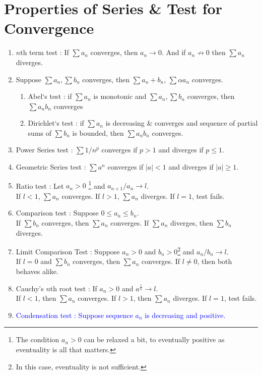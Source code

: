 \section{Properties of Series \& Test for Convergence}
\begin{enumerate}
	\item $n$th term test : If $\sum a_n$ converges, then $a_n \to 0$. And if $a_n \not\to 0$ then $\sum a_n$ diverges.
	\item Suppose $\sum a_n, \sum b_n$ converges, then $\sum a_n+b_n$, $\sum \alpha a_n$ converges.
		\begin{enumerate}
			\item Abel`s test : if $\sum a_n$ is monotonic and $\sum a_n,\sum b_n$ converges, then $\sum a_nb_n$ converges
			\item Dirichlet`s test : if $\sum a_n$ is decreasing \& converges and sequence of partial sums of $\sum b_n$ is bounded, then $\sum a_nb_n$ converges.
		\end{enumerate}
	\item Power Series test : $\sum 1/n^p$ converges if $p>1$ and diverges if $p \le 1$.
	\item Geometric Series test : $\sum a^n$ converges if $|a| < 1$ and diverges if $|a| \ge 1$.
	\item Ratio test : Let $a_n > 0$ \footnote{The condition $a_n > 0$ can be relaxed a bit, to eventually positive as eventuality is all that matters.} and $a_{n+1}/a_n \to l$.\\
		If $l<1$, $\sum a_n$ converges. If $l>1$, $\sum a_n$ diverges. If $l = 1$, test fails.
	\item Comparison test : Suppose $0 \le a_n \le b_n$.\\
		If $\sum b_n$ converges, then $\sum a_n$ converges. If $\sum a_n$ diverges, then $\sum b_n$ diverges.
	\item { \color{red}Limit Comparison Test : Suppose $a_n > 0$ and $b_n > 0$\footnote{In this case, eventuality is not sufficient.} and $a_n/b_n \to l$.\\
		If $l = 0$ and $\sum b_n$ converges, then $\sum a_n$ converges.
		If $l \ne 0$, then both behaves alike.}
	\item Cauchy's $n$th root test : If $a_n > 0$ and $a^\frac{1}{n} \to l$.\\
		If $l < 1$, then $\sum a_n$ converges. If $l > 1$, then $\sum a_n$ diverges. If $l = 1$, test fails.
	\item \textcolor{blue}{Condensation test : Suppose sequence $a_n$ is decreasing and positive.\\
}
\end{enumerate}

